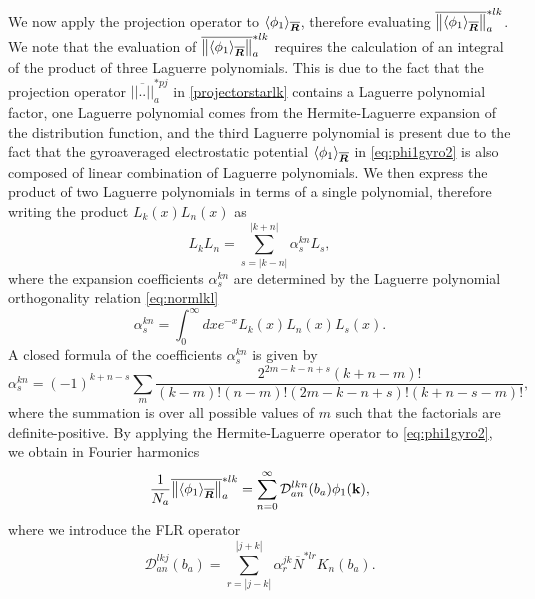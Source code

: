 We now apply the projection operator to $\left<\phi_1\right>_{\gyR}$, therefore evaluating $\ovmomentstar{lk}{\left<\phi_1\right>_{\gyR}}$.
%
We note that the evaluation of $\ovmomentstar{lk}{\left<\phi_1\right>_{\gyR}}$ requires the calculation of an integral of the product of three Laguerre polynomials.
%
This is due to the fact that the projection operator $\overline{||..||}_a^{*pj}$ in \cref{projectorstarlk} contains a Laguerre polynomial factor, one Laguerre polynomial comes from the Hermite-Laguerre expansion of the distribution function, and the third Laguerre polynomial is present due to the fact that the gyroaveraged electrostatic potential $\left<\phi_1\right>_{\gyR}$ in \cref{eq:phi1gyro2} is also composed of linear combination of Laguerre polynomials.
%
We then express the product of two Laguerre polynomials in terms of a single polynomial, therefore writing the product $L_k(x) L_n(x)$ as
%
\begin{equation} \label{laguerrelaguerre2laguerre}
 L_k L_n = \sum_{s = \lvert k - n\rvert}^{ \lvert k + n\rvert} \alpha^{kn}_s L_s,
\end{equation}
%
where the expansion coefficients $\alpha^{kn}_s$ are determined by the Laguerre polynomial orthogonality relation \cref{eq:normlkl} 
%
\begin{equation}
\alpha^{kn}_{s} = \int_0^{\infty} d x e^{-x} L_{k}(x) L_{n}(x) L_s(x).
\end{equation}
%
A closed formula of the coefficients $\alpha_s^{kn}$ is given by \citep{Gillis1960}
%
\begin{equation} \label{alphaknt}
\alpha^{kn}_s = \left( - 1 \right)^{k+n - s } \sum_{m} \frac{ 2^{2m - k -n +s }   \left( k + n - m \right)!}{(k-m)!(n-m)!(2m - k - n +s)!(k+n -s -m)!},
\end{equation}
%
where the summation is over all possible values of $m$ such that the factorials are definite-positive.
%
By applying the Hermite-Laguerre operator to \cref{eq:phi1gyro2}, we obtain in Fourier harmonics
%
\begin{equation}\label{momentlkgyaverphi1}
    \frac{1}{N_a}\ovmomentstar{lk}{\gyaver{\phi_1}_{\gyR}} = \sum_{n=0}^\infty \mathcal{D}_{an}^{lkn}(b_a)  \phi_1(\mathbf k ),
\end{equation}
%
where we introduce the FLR operator
%
\begin{equation} \label{Danlkj}
\mathcal{D}_{an}^{lkj}(b_a)= \sum_{r = |j-k|}^{|j+k|} \alpha_r^{jk} \overline N^{*lr} K_{n}(b_a).
\end{equation}

